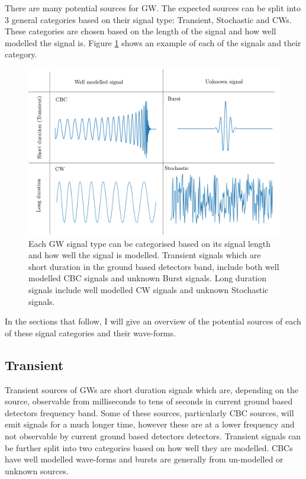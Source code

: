 There are many potential sources for \gls{GW}. The expected sources can be split into 3 general categories based on their signal type: Transient, Stochastic and \glspl{CW}.
These categories are chosen based on the length of the signal and how well modelled the signal is.
Figure \ref{intro:sources:signaltypes} shows an example of each of the signals and their category.
%
\begin{figure}[h]
    \centering
    \includegraphics[width=\textwidth]{C1_intro/sources_types.pdf}
    \caption[GW signal types]{Each \gls{GW} signal type can be categorised based on its signal length and how well the signal is modelled. Transient signals which are short duration in the ground based detectors band, include both well modelled \gls{CBC} signals and unknown Burst signals. Long duration signals include well modelled \gls{CW} signals and unknown Stochastic signals.}
    \label{intro:sources:signaltypes}
\end{figure}
In the sections that follow, I will give an overview of the potential sources of each of these signal categories and their wave-forms.


\subsection{\label{sources:transient}Transient}

Transient sources of \glspl{GW} are short duration signals which are, depending on the source, observable from milliseconds to tens of seconds in current ground based detectors frequency band. 
Some of these sources, particularly \gls{CBC} sources, will emit signals for a much longer time, however these are at a lower frequency and not observable by current ground based detectors detectors.
Transient signals can be further split into two categories based on how well they are modelled. 
\glspl{CBC} have well modelled wave-forms and bursts are generally from un-modelled or unknown sources.

